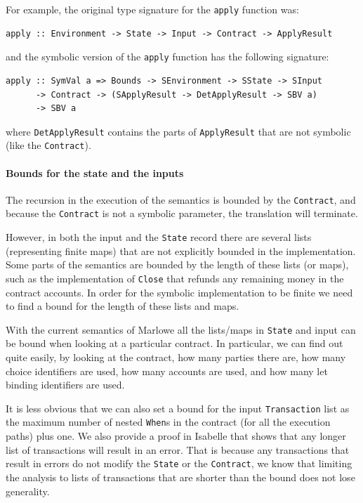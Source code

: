 \documentclass[runningheads]{llncs}
\begin{document}
For example, the original type signature for the \texttt{apply} function was:

\begin{verbatim}
apply :: Environment -> State -> Input -> Contract -> ApplyResult
\end{verbatim}

\noindent
and the symbolic version of the \texttt{apply} function has the following signature:

\begin{verbatim}
apply :: SymVal a => Bounds -> SEnvironment -> SState -> SInput
      -> Contract -> (SApplyResult -> DetApplyResult -> SBV a)
      -> SBV a
\end{verbatim}

\noindent
where \texttt{DetApplyResult} contains the parts of \texttt{ApplyResult} that are not symbolic (like the \texttt{Contract}).

\paragraph{Bounds for the state and the inputs}

The recursion in the execution of the semantics is bounded by the \texttt{Contract}, and because the \texttt{Contract} is not a symbolic parameter, the translation will terminate.

However, in both the input and the \texttt{State} record there are several lists (representing finite maps) that are not explicitly bounded in the implementation. Some parts of the semantics are bounded by the length of these lists (or maps), such as the implementation of \texttt{Close} that refunds any remaining money in the contract accounts.
In order for the symbolic implementation to be finite we need to find a bound for the length of these lists and maps.

With the current semantics of Marlowe all the lists/maps in \texttt{State} and input can be bound when looking at a particular contract. In particular, we can find out quite easily, by looking at the contract, how many parties there are, how many choice identifiers are used, how many accounts are used, and how many let binding identifiers are used.

It is less obvious that we can also set a bound for the input \texttt{Transaction} list as the maximum number of nested \texttt{When}s in the contract (for all the execution paths) plus one. We also provide a proof in Isabelle that shows that any longer list of transactions will result in an error. 
That is because any transactions that result in errors do not modify the \texttt{State} or the \texttt{Contract}, we know that limiting the analysis to lists of transactions that are shorter than the bound does not lose generality.
\end{document}
